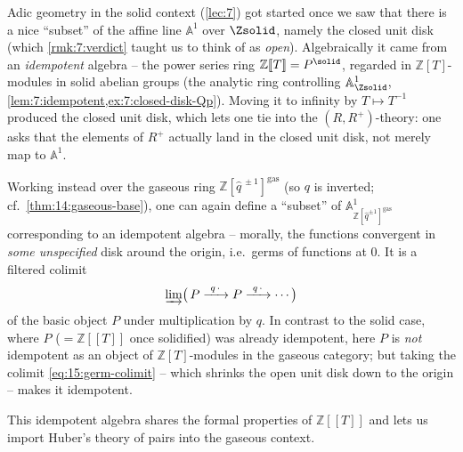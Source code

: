 \begin{remark}
\label{rmk:15:recall-solid-disk}
Adic geometry in the solid context (\cref{lec:7}) got started once we saw that there
is a nice ``subset'' of the affine line $\mathbb{A}^1$ over $\Zsolid$, namely the
closed unit disk (which \cref{rmk:7:verdict} taught us to think of as \emph{open}).
Algebraically it came from an \emph{idempotent} algebra -- the power series ring
$\mathbb{Z}[\![T]\!] = P^{\solid}$, regarded in $\mathbb{Z}[T]$-modules in solid
abelian groups (the analytic ring controlling $\mathbb{A}^1_{\Zsolid}$,
\cref{lem:7:idempotent,ex:7:closed-disk-Qp}). Moving it to infinity by $T\mapsto
T^{-1}$ produced the closed unit disk, which lets one tie into the $(R,R^+)$-theory:
one asks that the elements of $R^+$ actually land in the closed unit disk, not merely
map to $\mathbb{A}^1$.
\end{remark}

\begin{remark}
\label{rmk:15:germs}
Working instead over the gaseous ring $\mathbb{Z}[\widehat{q}^{\,\pm1}]^{\mathrm{gas}}$
(so $q$ is inverted; cf.\ \cref{thm:14:gaseous-base}), one can again define a
``subset'' of $\mathbb{A}^1_{\mathbb{Z}[\widehat q^{\pm1}]^{\mathrm{gas}}}$
corresponding to an idempotent algebra -- morally, the functions convergent in
\emph{some unspecified} disk around the origin, i.e.\ germs of functions at $0$. It is
a filtered colimit
\begin{equation}
\label{eq:15:germ-colimit}
\varinjlim\bigl(\,P \xrightarrow{\ q\,\cdot\ } P \xrightarrow{\ q\,\cdot\ } \cdots\,\bigr)
\end{equation}
of the basic object $P$ under multiplication by $q$. In contrast to the solid case,
where $P$ ($=\mathbb{Z}[\![T]\!]$ once solidified) was already idempotent, here $P$ is
\emph{not} idempotent as an object of $\mathbb{Z}[T]$-modules in the gaseous category;
but taking the colimit \eqref{eq:15:germ-colimit} -- which shrinks the open unit disk
down to the origin -- makes it idempotent.
\end{remark}

This idempotent algebra shares the formal properties of $\mathbb{Z}[\![T]\!]$ and lets
us import Huber's theory of pairs into the gaseous context.

